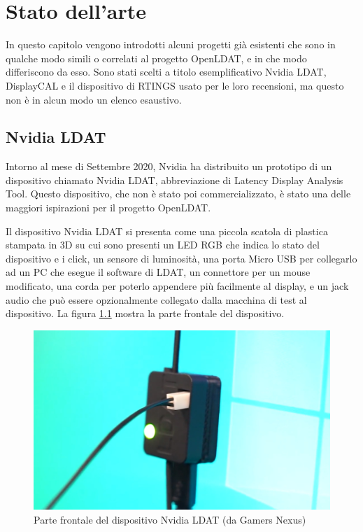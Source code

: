 \setlength{\parskip}{1em}
\setlength{\parindent}{0pt}
\chapter{Stato dell'arte}
\label{chap:statoarte}

In questo capitolo vengono introdotti alcuni progetti già esistenti che sono in qualche modo simili o correlati al progetto OpenLDAT, e in che modo differiscono da esso. Sono stati scelti a titolo esemplificativo Nvidia LDAT, DisplayCAL e il dispositivo di RTINGS usato per le loro recensioni, ma questo non è in alcun modo un elenco esaustivo.

\section{Nvidia LDAT}
Intorno al mese di Settembre 2020, Nvidia ha distribuito un prototipo di un dispositivo chiamato Nvidia LDAT, abbreviazione di Latency Display Analysis Tool. Questo dispositivo, che non è stato poi commercializzato, è stato una delle maggiori ispirazioni per il progetto OpenLDAT.

Il dispositivo Nvidia LDAT si presenta come una piccola scatola di plastica stampata in 3D su cui sono presenti un LED RGB che indica lo stato del dispositivo e i click, un sensore di luminosità, una porta Micro USB per collegarlo ad un PC che esegue il software di LDAT, un connettore per un mouse modificato, una corda per poterlo appendere più facilmente al display, e un jack audio che può essere opzionalmente collegato dalla macchina di test al dispositivo. La figura \ref{fig:nvldat_front} mostra la parte frontale del dispositivo.

\begin{figure}[h!]
	\centering
	\includegraphics[width=\textwidth]{StatoDellArte_files/nvldat_front.jpg}
	\caption{Parte frontale del dispositivo Nvidia LDAT (da Gamers Nexus)}
	\label{fig:nvldat_front}
\end{figure}

